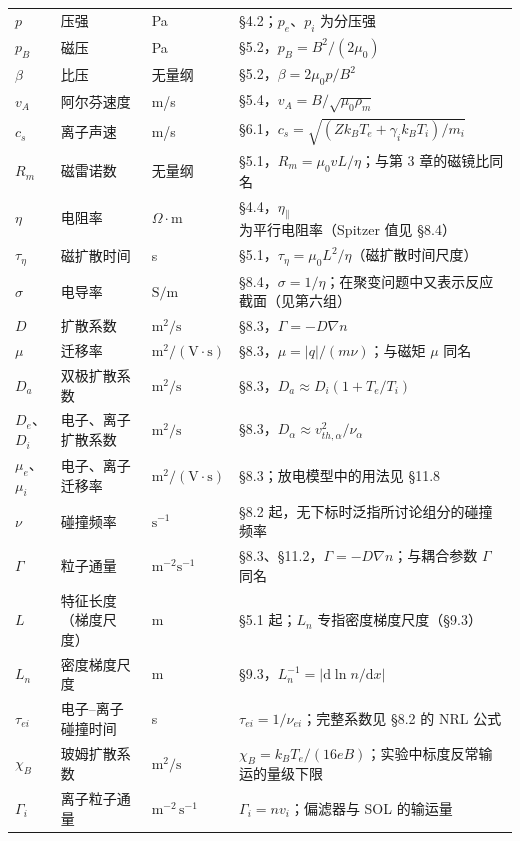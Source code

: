 \documentclass[12pt,a4paper,openany,oneside]{book}
\newcommand{\diff}{\mathrm{d}}
\newcommand{\grad}{\nabla}
\begin{document}
{\begin{longtable}{@{}p{1.8cm}p{4.4cm}p{3.3cm}p{5.1cm}@{}}
$p$ & 压强 & Pa & \S 4.2；$p_e$、$p_i$ 为分压强 \\
$p_B$ & 磁压 & Pa & \S 5.2，$p_B = B^2/(2\mu_0)$ \\
$\beta$ & 比压 & 无量纲 & \S 5.2，$\beta = 2\mu_0 p/B^2$ \\
$v_A$ & 阿尔芬速度 & m/s & \S 5.4，$v_A = B/\sqrt{\mu_0\rho_m}$ \\
$c_s$ & 离子声速 & m/s & \S 6.1，$c_s = \sqrt{(Zk_{B}T_e + \gamma_ik_{B}T_i)/m_i}$ \\
$R_m$ & 磁雷诺数 & 无量纲 & \S 5.1，$R_m = \mu_0vL/\eta$；与第 3 章的磁镜比同名 \\
$\eta$ & 电阻率 & $\Omega\cdot$m & \S 4.4，$\eta_\parallel$ 为平行电阻率（Spitzer 值见 \S 8.4） \\
$\tau_\eta$ & 磁扩散时间 & s & \S 5.1，$\tau_\eta = \mu_0L^2/\eta$（磁扩散时间尺度） \\
$\sigma$ & 电导率 & $\mathrm{S/m}$ & \S 8.4，$\sigma = 1/\eta$；在聚变问题中又表示反应截面（见第六组） \\
$D$ & 扩散系数 & $\mathrm{m^2/s}$ & \S 8.3，$\Gamma = -D\grad n$ \\
$\mu$ & 迁移率 & $\mathrm{m^2/(V\cdot s)}$ & \S 8.3，$\mu = |q|/(m\nu)$；与磁矩 $\mu$ 同名 \\
$D_a$ & 双极扩散系数 & $\mathrm{m^2/s}$ & \S 8.3，$D_a \approx D_i(1+T_e/T_i)$ \\
$D_e$、$D_i$ & 电子、离子扩散系数 & $\mathrm{m^2/s}$ & \S 8.3，$D_\alpha \approx v_{th,\alpha}^2/\nu_\alpha$ \\
$\mu_e$、$\mu_i$ & 电子、离子迁移率 & $\mathrm{m^2/(V\cdot s)}$ & \S 8.3；放电模型中的用法见 \S 11.8 \\
$\nu$ & 碰撞频率 & $\mathrm{s^{-1}}$ & \S 8.2 起，无下标时泛指所讨论组分的碰撞频率 \\
$\Gamma$ & 粒子通量 & $\mathrm{m^{-2}s^{-1}}$ & \S 8.3、\S 11.2，$\Gamma = -D\grad n$；与耦合参数 $\Gamma$ 同名 \\
$L$ & 特征长度（梯度尺度） & m & \S 5.1 起；$L_n$ 专指密度梯度尺度（\S 9.3） \\
$L_n$ & 密度梯度尺度 & m & \S 9.3，$L_n^{-1} = |\diff\ln n/\diff x|$ \\
$\tau_{ei}$ & 电子--离子碰撞时间 & s & $\tau_{ei} = 1/\nu_{ei}$；完整系数见 \S 8.2 的 NRL 公式 \\
$\chi_B$ & 玻姆扩散系数 & $\mathrm{m^2/s}$ & $\chi_B = k_{B}T_e/(16eB)$；实验中标度反常输运的量级下限 \\
$\Gamma_i$ & 离子粒子通量 & $\mathrm{m^{-2}\,s^{-1}}$ & $\Gamma_i = n v_i$；偏滤器与 SOL 的输运量 \\

\end{longtable}}
\end{document}
